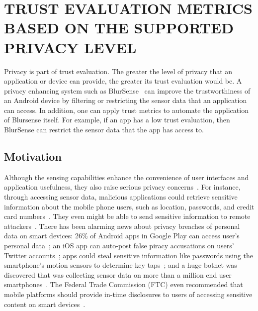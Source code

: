 \section{TRUST EVALUATION METRICS BASED ON THE SUPPORTED PRIVACY LEVEL}
\label{sec:blursense}
Privacy is part of trust evaluation.
The greater the level of privacy that an application or device can provide, the greater its trust evaluation would be.
A privacy enhancing system such as BlurSense~\cite{cappos2014blursense} can improve the trustworthiness of an Android device  
 by filtering or restricting the sensor data that an application can access.
In addition,
one can apply trust metrics to automate the application of Blursense itself.  For example, if an app has a low trust evaluation,
then BlurSense can restrict the sensor data that the app has access to.

\subsection{Motivation}
Although the sensing capabilities enhance the convenience of user interfaces and
application usefulness, they also raise serious privacy
concerns~\cite{shabtai2010google}. For instance, through accessing sensor data,
malicious applications could retrieve sensitive information about the mobile
phone users, such as location, passwords, and credit card numbers~\cite{xu2012taplogger, 
miluzzo2012tapprints, xu2009stealthy, cai2011touchlogger}. They
even might be able to send sensitive information to remote
attackers~\cite{schlegel2011soundcomber, marquardt2011sp}. There
has been alarming news about privacy breaches of personal data on smart devices:
26\% of Android apps in Google Play can access user's personal
data~\cite{toomuch}; an iOS app can auto-post false piracy accusations on users'
Twitter accounts~\cite{tweetios}; apps could steal sensitive information like
passwords using the smartphone's motion sensors to determine key 
taps~\cite{xu2012taplogger}; and a huge botnet was discovered that was collecting sensor data
on more than a million end user smartphones~\cite{botnet}. The
Federal Trade Commission (FTC) even recommended that mobile platforms should
provide in-time disclosures to users of accessing sensitive content on smart
devices~\cite{ftc}. 

